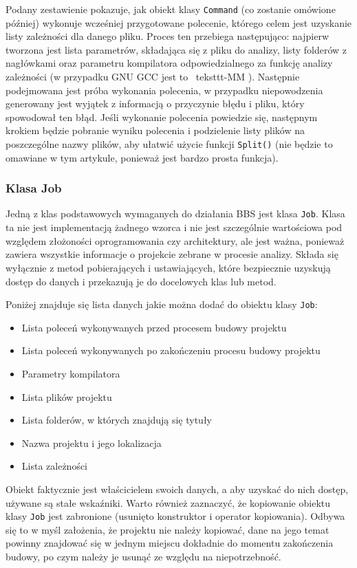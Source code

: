 Podany zestawienie pokazuje, jak obiekt klasy \texttt{Command} (co zostanie omówione później) wykonuje wcześniej przygotowane polecenie, którego celem jest uzyskanie listy zależności dla danego pliku. Proces ten przebiega następująco: najpierw tworzona jest lista parametrów, składająca się z pliku do analizy, listy folderów z nagłówkami oraz parametru kompilatora odpowiedzialnego za funkcję analizy zależności (w przypadku GNU GCC jest to \ teksttt{-MM} \cite{gcc} ). Następnie podejmowana jest próba wykonania polecenia, w przypadku niepowodzenia generowany jest wyjątek z informacją o przyczynie błędu i pliku, który spowodował ten błąd. Jeśli wykonanie polecenia powiedzie się, następnym krokiem będzie pobranie wyniku polecenia i podzielenie listy plików na poszczególne nazwy plików, aby ułatwić użycie funkcji \texttt{Split()} (nie będzie to omawiane w tym artykule, ponieważ jest bardzo prosta funkcja).

\subsubsection{Klasa Job}

Jedną z klas podstawowych wymaganych do działania BBS jest klasa \texttt{Job}. Klasa ta nie jest implementacją żadnego wzorca i nie jest szczególnie wartościowa pod względem złożoności oprogramowania czy architektury, ale jest ważna, ponieważ zawiera wszystkie informacje o projekcie zebrane w procesie analizy. Składa się wyłącznie z metod pobierających i ustawiających, które bezpiecznie uzyskują dostęp do danych i przekazują je do docelowych klas lub metod.

Poniżej znajduje się lista danych jakie można dodać do obiektu klasy \texttt{Job}:
\begin{itemize}
    \item Lista poleceń wykonywanych przed procesem budowy projektu
    \item Lista poleceń wykonywanych po zakończeniu procesu budowy projektu
    \item Parametry kompilatora
    \item Lista plików projektu
    \item Lista folderów, w których znajdują się tytuły
    \item Nazwa projektu i jego lokalizacja
    \item Lista zależności
\end{itemize}

Obiekt faktycznie jest właścicielem swoich danych, a aby uzyskać do nich dostęp, używane są stałe wskaźniki. Warto również zaznaczyć, że kopiowanie obiektu klasy \texttt{Job} jest zabronione (usunięto konstruktor i operator kopiowania). Odbywa się to w myśl założenia, że projektu nie należy kopiować, dane na jego temat powinny znajdować się w jednym miejscu dokładnie do momentu zakończenia budowy, po czym należy je usunąć ze względu na niepotrzebność.

